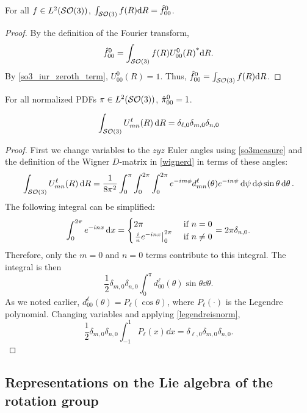 \documentclass[../../main.tex]{subfiles}
\begin{document}
\begin{refsection}
	\begin{theorem} \label{iurso3isnorm}
		For all $f \in L^2(\mathcal{SO} (3))$, $\int_{\mathcal{SO} (3)} f(R) \dd R = \hat{f}^0_{00}$.
	\end{theorem}
	\begin{proof}
		By the definition of the Fourier transform,
		$$\hat{f}^0_{00} = \int_{\mathcal{SO} (3)} f(R) {U^0_{00}(R)}^* \dd R.$$
		By \cref{so3_iur_zeroth_term}, $U^0_{00}(R) = 1$.
		Thus, $\hat{f}^0_{00} = \int_{\mathcal{SO} (3)} f(R) \dd R$.
	\end{proof}

	\begin{corollary}
		For all normalized PDFs $\pi \in L^2(\mathcal{SO} (3))$, $\hat{\pi}^0_{00} = 1$.
	\end{corollary}

	\begin{theorem} \label{iurso3marginalized}
		$$\int_{\mathcal{SO} (3)} U^\ell_{mn}(R) \dd{R} = \delta_{\ell,0} \delta_{m,0} \delta_{n,0}$$
	\end{theorem}
	\begin{proof}
		First we change variables to the $zyz$ Euler angles using \cref{so3measure} and the definition of the Wigner $D$-matrix in \cref{wignerd} in terms of these angles:
		$$\int_{\mathcal{SO} (3)} U^\ell_{mn}(R) \dd{R} = \frac{1}{8 \pi^2} \int_0^\pi \int_0^{2\pi} \int_0^{2\pi} e^{-i m \phi} d^\ell_{mn}(\theta) e^{-i n \psi} \dd{\psi} \dd{\phi} \sin\theta \dd{\theta}.$$
		The following integral can be simplified:
		$$\int_0^{2\pi} e^{-\im n x} \dd{x} = \begin{cases} 2\pi &\text{ if } n = 0\\ \eval{\frac{\im}{n} e^{-\im n x}}_0^{2\pi} &\text{ if } n \ne 0 \end{cases} = 2\pi \delta_{n,0}.$$
		Therefore, only the $m=0$ and $n=0$ terms contribute to this integral.
		The integral is then
		$$\frac{1}{2} \delta_{m,0} \delta_{n,0} \int_0^\pi d^\ell_{00}(\theta) \sin\theta \dd{\theta}.$$
		As we noted earlier, $d^\ell_{00}(\theta) = P_\ell(\cos\theta)$, where $P_\ell(\cdot)$ is the Legendre polynomial.
		Changing variables and applying \cref{legendreisnorm},
		$$\frac{1}{2} \delta_{m,0} \delta_{n,0} \int_{-1}^1 P_\ell(x) \dd{x} = \delta_{\ell,0} \delta_{m,0} \delta_{n,0}.$$
	\end{proof}

	\clearpage %
	\subsection{Representations on the Lie algebra of the rotation group}


\end{refsection}
\end{document}
